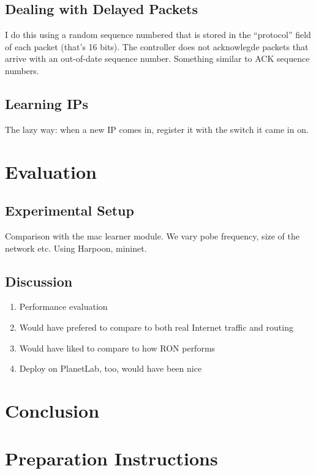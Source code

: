 \documentclass[pageno]{jpaper}
\begin{document}
\subsection{Dealing with Delayed Packets}
I do this using a random sequence numbered that is stored in the ``protocol'' field of each packet 
(that's 16 bits). The controller does not acknowlegde packets that arrive with an out-of-date sequence
number. Something similar to ACK sequence numbers.



\subsection{Learning IPs}
The lazy way: when a new IP comes in, register it with the switch it came in on.


\section{Evaluation}
\subsection{Experimental Setup}
Comparison with the mac learner module. We vary pobe frequency, size of the network etc.
Using Harpoon, mininet.

\subsection{Discussion}
\begin{enumerate}
\item
Performance evaluation
\item
Would have prefered to compare to both real Internet traffic and routing
\item
Would have liked to compare to how RON performs
\item
Deploy on PlanetLab, too, would have been nice
\end{enumerate}

\section{Conclusion}



\section{Preparation Instructions}


\end{document}
